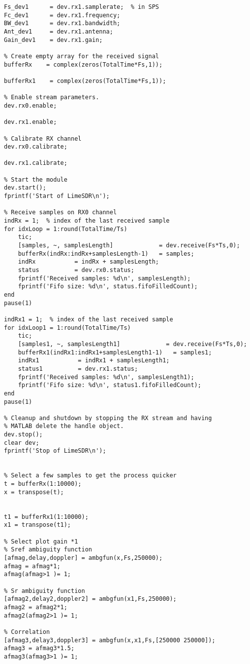 \begin{verbatim}
Fs_dev1      = dev.rx1.samplerate;  % in SPS
Fc_dev1      = dev.rx1.frequency;
BW_dev1      = dev.rx1.bandwidth;
Ant_dev1     = dev.rx1.antenna;
Gain_dev1    = dev.rx1.gain;

% Create empty array for the received signal
bufferRx    = complex(zeros(TotalTime*Fs,1));

bufferRx1    = complex(zeros(TotalTime*Fs,1));

% Enable stream parameters. 
dev.rx0.enable;

dev.rx1.enable;

% Calibrate RX channel
dev.rx0.calibrate;

dev.rx1.calibrate;

% Start the module
dev.start();
fprintf('Start of LimeSDR\n');

% Receive samples on RX0 channel
indRx = 1;  % index of the last received sample
for idxLoop = 1:round(TotalTime/Ts)
    tic;
    [samples, ~, samplesLength]             = dev.receive(Fs*Ts,0);
    bufferRx(indRx:indRx+samplesLength-1)   = samples;
    indRx           = indRx + samplesLength;
    status          = dev.rx0.status;
    fprintf('Received samples: %d\n', samplesLength);
    fprintf('Fifo size: %d\n', status.fifoFilledCount);
end
pause(1)

indRx1 = 1;  % index of the last received sample
for idxLoop1 = 1:round(TotalTime/Ts)
    tic;
    [samples1, ~, samplesLength1]             = dev.receive(Fs*Ts,0);
    bufferRx1(indRx1:indRx1+samplesLength1-1)   = samples1;
    indRx1           = indRx1 + samplesLength1;
    status1          = dev.rx1.status;
    fprintf('Received samples: %d\n', samplesLength1);
    fprintf('Fifo size: %d\n', status1.fifoFilledCount);
end
pause(1)

% Cleanup and shutdown by stopping the RX stream and having 
% MATLAB delete the handle object.
dev.stop();
clear dev;
fprintf('Stop of LimeSDR\n');


% Select a few samples to get the process quicker
t = bufferRx(1:10000);
x = transpose(t);


t1 = bufferRx1(1:10000);
x1 = transpose(t1);

% Select plot gain *1
% Sref ambiguity function
[afmag,delay,doppler] = ambgfun(x,Fs,250000);
afmag = afmag*1;
afmag(afmag>1 )= 1;

% Sr ambiguity function
[afmag2,delay2,doppler2] = ambgfun(x1,Fs,250000);
afmag2 = afmag2*1;
afmag2(afmag2>1 )= 1;

% Correlation
[afmag3,delay3,doppler3] = ambgfun(x,x1,Fs,[250000 250000]);
afmag3 = afmag3*1.5;
afmag3(afmag3>1 )= 1;



\end{verbatim}
